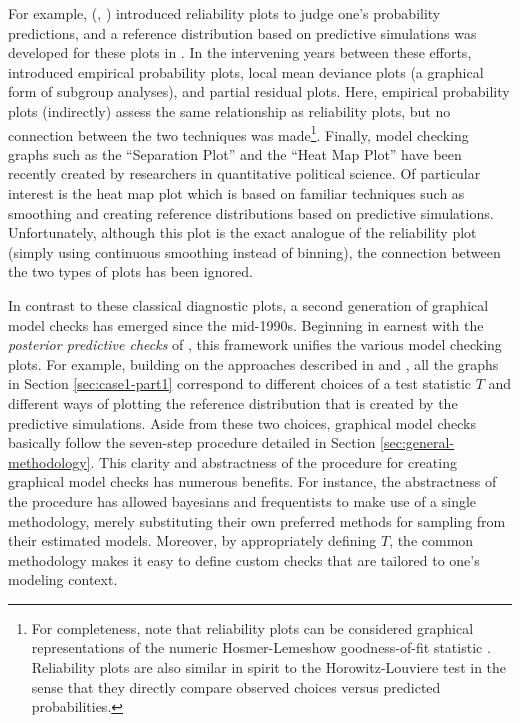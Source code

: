 \documentclass[preprint]{elsarticle}
\begin{document}
For example, \citeauthor{murphy_reliability_1977} (\citeyear{murphy_reliability_1977}, \citeyear{murphy_general_1987}) introduced reliability plots to judge one's probability predictions, and a reference distribution based on predictive simulations was developed for these plots in \citet{brocker_increasing_2007}. In the intervening years between these efforts, \citet{landwehr_graphical_1984} introduced empirical probability plots, local mean deviance plots (a graphical form of subgroup analyses), and partial residual plots. Here, empirical probability plots (indirectly) assess the same relationship as reliability plots, but no connection between the two techniques was made\footnote{For completeness, note that reliability plots can be considered graphical representations of the numeric Hosmer-Lemeshow goodness-of-fit statistic \citep{lemeshow_review_1982}. Reliability plots are also similar in spirit to the Horowitz-Louviere test \citep{horowitz_testing_1985, horowitz_testing_1993} in the sense that they directly compare observed choices versus predicted probabilities.}. Finally, model checking graphs such as the ``Separation Plot'' \citep{greenhill_separation_2011} and the ``Heat Map Plot'' \citep{esarey_assessing_2012} have been recently created by researchers in quantitative political science. Of particular interest is the heat map plot which is based on familiar techniques such as smoothing and creating reference distributions based on predictive simulations. Unfortunately, although this plot is the exact analogue of the reliability plot (simply using continuous smoothing instead of binning), the connection between the two types of plots has been ignored.

In contrast to these classical diagnostic plots, a second generation of graphical model checks has emerged since the mid-1990s. Beginning in earnest with the \textit{posterior predictive checks} of \citet{gelman_posterior_1996}, this framework unifies the various model checking plots. For example, building on the approaches described in \citet{gelman_exploratory_2004} and \citet{buja_statistical_2009}, all the graphs in Section \ref{sec:case1-part1} correspond to different choices of a test statistic $T$ and different ways of plotting the reference distribution that is created by the predictive simulations. Aside from these two choices, graphical model checks basically follow the seven-step procedure detailed in Section \ref{sec:general-methodology}. This clarity and abstractness of the procedure for creating graphical model checks has numerous benefits. For instance, the abstractness of the procedure has allowed bayesians and frequentists to make use of a single methodology, merely substituting their own preferred methods for sampling from their estimated models. Moreover, by appropriately defining $T$, the common methodology makes it easy to define custom checks that are tailored to one's modeling context.
\end{document}
